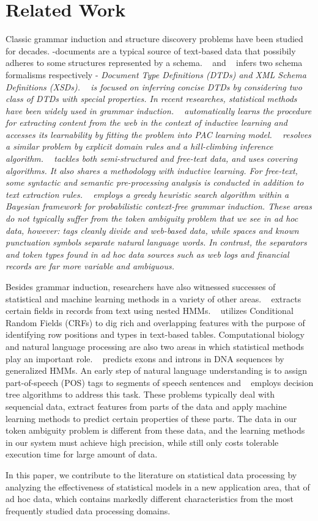 \section{Related Work}\label{sec:related}
Classic grammar induction and structure discovery problems have been
studied for decades. \xml{}-documents are a typical source of
text-based data that possibily adheres to some structures represented by a
schema. ~\cite{garofalakis+:xtract} and ~\cite{bex+:inferring-xml-schema}
infers two \xml{} schema formalisms respectively -
\em{Document Type Definitions} (DTDs) and \em{XML Schema Definitions}
(XSDs). ~\cite{bex+:dtd-inference} is focused on inferring
concise DTDs by considering two class of DTDs with special
properties. In recent researches, statistical methods have been widely
used in grammar induction. ~\cite{kushmerick-phd1997} automatically learns the procedure
for extracting content from the web in the context of inductive
learning and accesses its learnability by
fitting the problem into PAC learning model. ~\cite{hong:thesis}
resolves a similar problem by explicit domain rules and a
hill-climbing inference algorithm. ~\cite{soderland:whisk} tackles
both semi-structured and free-text data, and uses covering algorithms.
It also shares a methodology with inductive learning. For free-text,
some syntactic and semantic pre-processing analysis is conducted in
addition to text extraction rules. ~\cite{Chen95bayesiangrammar}
employs a greedy heuristic search algorithm within a Bayesian
framework for probabilistic context-free grammar induction. 
These areas do not typically suffer from the
token ambiguity problem that we see in ad hoc data, however:
tags cleanly divide
\xml{} and web-based data, while spaces and known punctuation symbols
separate natural language words.
In contrast,
the separators and token types found in ad hoc data sources such as
web logs and financial records are far more variable and
ambiguous.  

Besides grammar induction, researchers have also witnessed successes of
statistical and machine learning methods in a variety of other areas.
~\cite{borkar+:text-segmentation} extracts certain fields in records
from text using nested HMMs. ~\cite{Pinto+:texttables} utilizes
Conditional Random Fields (CRFs) to dig rich and overlapping features
with the purpose of identifying row positions and types in text-based
tables. Computational biology and natural language processing are also
two areas in which statistical methods play an important
role. ~\cite{kulp96generalized} predicts exons and introns in DNA
sequences by generalized HMMs. An early step of natural language
understanding is to assign part-of-speech (POS) tags to segments of
speech sentences and ~\cite{Heeman99:speech} employs decision tree
algorithms to address this task. These problems typically deal with
sequencial data, extract features from parts of the data and apply
machine learning methods to predict certain properties of these
parts. The data in our token ambiguity problem is different from these
data, and the learning methods in our system must achieve high
precision, while still only costs tolerable execution time for large
amount of data.

In this paper, we contribute to the literature on statistical
data processing by analyzing the effectiveness of statistical models
in a new application area, that of ad hoc data, which contains
markedly different characteristics from the most frequently studied
data processing domains.
